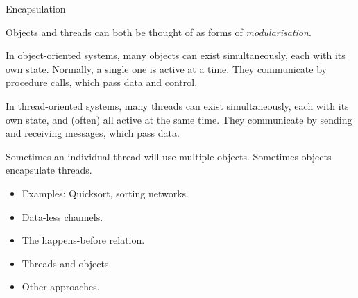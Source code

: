 Encapsulation


Objects and threads can both be thought of as forms of
\emph{modularisation}. 

In object-oriented systems, many objects can exist simultaneously, each with
its own state.  Normally, a single one is active at a time.  They communicate
by procedure calls, which pass data and control.

In thread-oriented systems, many threads can exist simultaneously, each
with its own state, and (often) all active at the same time.  They communicate
by sending and receiving messages, which pass data.

Sometimes an individual thread will use multiple objects.  Sometimes objects
encapsulate threads.


\begin{itemize}
\item Examples: Quicksort, sorting networks.

\item 
Data-less channels.

\item
The happens-before relation.

\item
Threads and objects.

\item
Other approaches.
\end{itemize}
